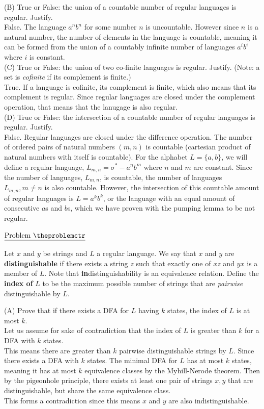 \documentclass[11pt]{article}
\def\pp{\par\noindent}
\begin{document}
\noindent (B) True or False: the union of a countable number of regular
languages is regular. Justify.\\
False. The language $a^nb^n$ for some number $n$ is uncountable. However since $n$ is a natural number, the number of elements in the language is countable, meaning it can be formed from the union of a countably infinite number of languages $a^ib^i$ where $i$ is constant.\\ 

\noindent (C) True or False: the union of two co-finite languages is regular.
Justify. (Note: a set is {\it cofinite} if its complement is finite.)\\
True. If a language is cofinite, its complement is finite, which also means that its complement is regular. Since regular languages are closed under the complement operation, that means that the lanugage is also regular.\\

\noindent (D) True or False: the intersection of a countable number of regular
languages is regular. Justify.\\
False. Regular languages are closed under the difference operation. The number of ordered pairs of natural numbers $(m,n)$ is countable (cartesian product of natural numbers with itself is countable). For the alphabet $L=\{a,b\}$, we will define a regular language, $L_{m,n}=\sigma^*-a^nb^m$ where $n$ and $m$ are constant. Since the number of languages, $L_{m,n}$, is countable, the number of languages $L_{m,n}, m\neq n$ is also countable. However, the intersection of this countable amount of regular languages is $L=a^kb^k$, or the language with an equal amount of consecutive $a$s and $b$s, which we have proven with the pumping lemma to be not regular. 

\bigskip
\addtocounter{problemctr}{1}
\noindent $\underline{\rm Problem\ \theproblemctr}$\pp
Let $x$ and $y$ be strings and $L$ a regular language. We say that $x$ and $y$
are \textbf{distinguishable} if there exists a string $z$ such that exactly one
of $xz$ and $yx$ is a member of $L$. Note that \textbf{in}distinguishability is
an equivalence relation. Define the \textbf{index of} $L$ to be the maximum
possible number of strings that are \textit{pairwise} distinguishable by $L$.

\bigskip
\noindent (A) Prove that if there exists a DFA for $L$ having $k$ states, the
index of $L$ is at most $k$.\\

Let us assume for sake of contradiction that the index of $L$ is greater than $k$ for a DFA with $k$ states.\\
This means there are greater than $k$ pairwise distinguishable strings by $L$. Since there exists a DFA with $k$ states. The minimal DFA for $L$ has at most $k$ states, meaning it has at most $k$ equivalence classes by the Myhill-Nerode theorem. Then by the pigeonhole principle, there exists at least one pair of strings $x,y$ that are distinguishable, but share the same equivalence class.\\
This forms a contradiction since this means $x$ and $y$ are also indistinguishable.\\
\end{document}
